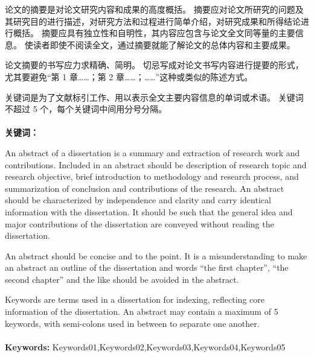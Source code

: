 
\begin{cnabstract} 
  论文的摘要是对论文研究内容和成果的高度概括。
  摘要应对论文所研究的问题及其研究目的进行描述，对研究方法和过程进行简单介绍，对研究成果和所得结论进行概括。
  摘要应具有独立性和自明性，其内容应包含与论文全文同等量的主要信息。
  使读者即使不阅读全文，通过摘要就能了解论文的总体内容和主要成果。

  论文摘要的书写应力求精确、简明。
  切忌写成对论文书写内容进行提要的形式，尤其要避免“第 1 章……；第 2 章……；……”这种或类似的陈述方式。

关键词是为了文献标引工作、用以表示全文主要内容信息的单词或术语。
关键词不超过 5 个，每个关键词中间用分号分隔。
 \\
 \\
 \heiti \bfseries{关键词：} 
\end{cnabstract} 
  
\begin{enabstract}
  \par An abstract of a dissertation is a summary and extraction of research work and contributions.
  Included in an abstract should be description of research topic and research objective, brief introduction to methodology and research process, and summarization of conclusion and contributions of the research.
  An abstract should be characterized by independence and clarity and carry identical information with the dissertation.
  It should be such that the general idea and major contributions of the dissertation are conveyed without reading the dissertation.

  An abstract should be concise and to the point.
  It is a misunderstanding to make an abstract an outline of the dissertation and words “the first chapter”, “the second chapter” and the like should be avoided in the abstract.

  Keywords are terms used in a dissertation for indexing, reflecting core information of the dissertation.
  An abstract may contain a maximum of 5 keywords, with semi-colons used in between to separate one another.
  \\
  \\
  \textbf{Keywords:} {Keywords01,Keywords02,Keywords03,Keywords04,Keywords05}
\end{enabstract}
